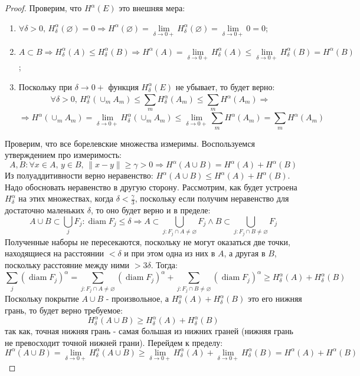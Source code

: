 \documentclass[12pt]{article}
\newcommand{\VN}{\varnothing}
\theoremstyle{definition}
\DeclareMathOperator{\diam}{\text{diam}}
\newcommand{\ddsum}[2]{\displaystyle\sum\limits_{#1}^{#2}}
\begin{document}
\begin{proof}
	Проверим, что $H^\alpha(E)$ это внешняя мера:
	\begin{enumerate}[label=\arabic*)]
		\item $\forall \delta > 0, \, H_\delta^\alpha(\VN) = 0 \Rightarrow H^\alpha(\VN) = \lim\limits_{\delta\to 0+}H_\delta^\alpha(\VN) = \lim\limits_{\delta\to 0+} 0 = 0$;
		\item $A \subset B \Rightarrow H_\delta^\alpha(A) \leq H_\delta^\alpha(B) \Rightarrow H^\alpha(A) = \lim\limits_{\delta\to 0+} H_\delta^\alpha(A) \leq \lim\limits_{\delta\to 0+}H_\delta^\alpha(B) = H^\alpha(B)$;
		\item Поскольку при $\delta \to 0+$ функция $H_\delta^\alpha(E)$ не убывает, то будет верно:
		$$
			\forall \delta > 0, \, H_\delta^\alpha(\cup_m A_m) \leq \ddsum{m}{} H_\delta^\alpha(A_m) \leq \ddsum{m}{} H^\alpha(A_m) \Rightarrow 
		$$
		$$
			\Rightarrow H^\alpha(\cup_m A_m) = \lim\limits_{\delta \to 0+}H_\delta^\alpha(\cup_m A_m) \leq \lim\limits_{\delta \to 0+} \ddsum{m}{} H^\alpha(A_m) = \ddsum{m}{} H^\alpha(A_m)
		$$
	\end{enumerate}
	Проверим, что все борелевские множества измеримы. Воспользуемся утверждением про измеримость:
	$$
		A, B \colon \forall x \in A,\, y \in B, \,  \|x - y\| \geq \gamma > 0 \Rightarrow H^\alpha(A \cup B) = H^\alpha(A) + H^\alpha(B)
	$$
	Из полуаддитивности верно неравенство: $H^\alpha(A \cup B) \leq H^\alpha(A) + H^\alpha(B)$. Надо обосновать неравенство в другую сторону. Рассмотрим, как будет устроена $H_\delta^\alpha$ на этих множествах, когда $\delta < \tfrac{\gamma}{3}$, поскольку если получим неравенство для достаточно маленьких $\delta$, то оно будет верно и в пределе:
	$$
		A \cup B \subset \bigcup\limits_j F_j \colon \diam{F_j} \leq \delta \Rightarrow A \subset \bigcup\limits_{j \colon F_j \cap A \neq \VN}F_j \wedge B \subset \bigcup\limits_{j \colon F_j \cap B \neq \VN}F_j
	$$
	Полученные наборы не пересекаются, поскольку не могут оказаться две точки, находящиеся на расстоянии $< \delta$ и при этом одна из них в $A$, а другая в $B$, поскольку расстояние между ними $> 3\delta$. Тогда:
	$$
		\ddsum{j}{}(\diam{F_j})^\alpha = \ddsum{j \colon F_j \cap A \neq \VN}{}(\diam{F_j})^\alpha + \ddsum{j \colon F_j \cap B \neq \VN}{}(\diam{F_j})^\alpha \geq H_\delta^\alpha(A) + H_\delta^\alpha(B)
	$$
	Поскольку покрытие $A \cup B$ - произвольное, а $H_\delta^\alpha(A) + H_\delta^\alpha(B)$ это его нижняя грань, то будет верно требуемое: 
	$$
		H_\delta^\alpha(A \cup B) \geq H_\delta^\alpha(A) + H_\delta^\alpha(B)
	$$ 
	так как, точная нижняя грань - самая большая из нижних граней (нижняя грань не превосходит точной нижней грани). Перейдем к пределу:
	$$
		H^\alpha(A \cup B) = \lim\limits_{\delta \to 0+}H_\delta^\alpha(A \cup B) \geq \lim\limits_{\delta \to 0+}H_\delta^\alpha(A) + \lim\limits_{\delta \to 0+}H_\delta^\alpha(B) = H^\alpha(A) + H^\alpha(B)
	$$
\end{proof}
\end{document}
